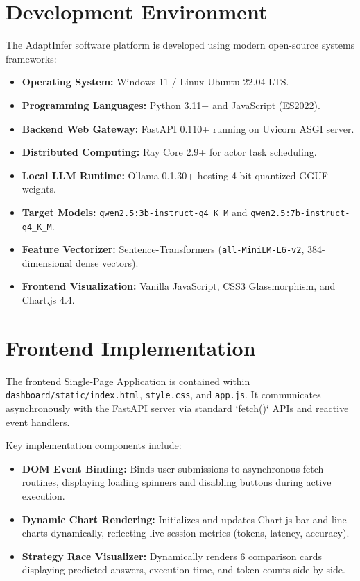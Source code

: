 \documentclass[12pt,a4paper]{report}
\begin{document}
\section{Development Environment}
\label{sec:development_environment}
The AdaptInfer software platform is developed using modern open-source systems frameworks:
\begin{itemize}[leftmargin=*]
    \item \textbf{Operating System:} Windows 11 / Linux Ubuntu 22.04 LTS.
    \item \textbf{Programming Languages:} Python 3.11+ and JavaScript (ES2022).
    \item \textbf{Backend Web Gateway:} FastAPI 0.110+ running on Uvicorn ASGI server.
    \item \textbf{Distributed Computing:} Ray Core 2.9+ for actor task scheduling.
    \item \textbf{Local LLM Runtime:} Ollama 0.1.30+ hosting 4-bit quantized GGUF weights.
    \item \textbf{Target Models:} \texttt{qwen2.5:3b-instruct-q4\_K\_M} and \texttt{qwen2.5:7b-instruct-q4\_K\_M}.
    \item \textbf{Feature Vectorizer:} Sentence-Transformers (\texttt{all-MiniLM-L6-v2}, 384-dimensional dense vectors).
    \item \textbf{Frontend Visualization:} Vanilla JavaScript, CSS3 Glassmorphism, and Chart.js 4.4.
\end{itemize}

\section{Frontend Implementation}
\label{sec:frontend_implementation}
The frontend Single-Page Application is contained within \texttt{dashboard/static/index.html}, \texttt{style.css}, and \texttt{app.js}. It communicates asynchronously with the FastAPI server via standard `fetch()` APIs and reactive event handlers.

Key implementation components include:
\begin{itemize}[leftmargin=*]
    \item \textbf{DOM Event Binding:} Binds user submissions to asynchronous fetch routines, displaying loading spinners and disabling buttons during active execution.
    \item \textbf{Dynamic Chart Rendering:} Initializes and updates Chart.js bar and line charts dynamically, reflecting live session metrics (tokens, latency, accuracy).
    \item \textbf{Strategy Race Visualizer:} Dynamically renders 6 comparison cards displaying predicted answers, execution time, and token counts side by side.
\end{itemize}
\end{document}
